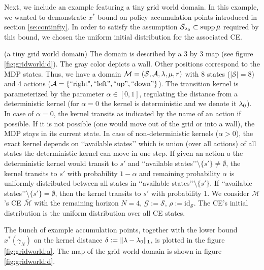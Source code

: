 Next, we include an example featuring a tiny grid world domain.
In this example, we wanted to demonstrate $x^*$ bound on \eUDRL{} policy
accumulation points introduced in section \ref{se:continfty}.
In order to satisfy the assumption $\bar{\mathcal{S}}_{\mathit{\lambda}_0} \subset \operatorname*{\mathrm{supp}} \bar{\mu}$ required by this bound, we chosen the uniform initial distribution for the associated CE.
\begin{example}\label{ex:gridworld} (a tiny grid world domain)
The domain is described by a 3 by 3 map (see figure \ref{fig:gridworld:d}).
The gray color depicts a wall. Other positions correspond to the MDP
states. Thus, we have a domain 
$\mathcal{M} = (\mathcal{S},\mathcal{A},\mathit{\lambda},\mu,r)$
with 8 states ($|\mathcal{S}| = 8$) and 4 actions 
($\mathcal{A}=\{\text{``right"},\text{\lq\lq{}left\rq\rq{}},\text{\lq\lq{}up\rq\rq{}},\text{\lq\lq{}down\rq\rq{}}\}$).
The transition kernel is parameterized by the parameter $\alpha \in [0,1]$,
regulating the distance from a deterministic kernel (for $\alpha =0$ the kernel
is deterministic and we denote it $\mathit{\lambda}_0$).
In case of $\alpha = 0$, the kernel transits as indicated by the name of an action if possible. If it is not possible (one would move out of the grid or into a wall), the MDP stays in its current state.
In case of non-deterministic kernels ($\alpha >0$), the exact kernel
depends on \lq\lq{}available states\rq\rq{} which is union (over all actions) of all states the deterministic kernel can move in one step. If given an action $a$
the deterministic kernel would transit to $s'$ and \lq\lq{}available states\rq\rq{}$\setminus \{s'\} \neq \emptyset$, the kernel transits to 
$s'$ with probability $1-\alpha$ and remaining probability $\alpha$
is uniformly distributed between all states in \lq\lq{}available states\rq\rq{}$\setminus \{s'\}$. If \lq\lq{}available states\rq\rq{}$\setminus \{s'\} = \emptyset$, then 
the kernel transits to $s'$ with probability 1.
We consider $\mathcal{M}$'s CE $\bar{\mathcal{M}}$ with the remaining horizon $N=4$,
$\mathcal{G}:=\mathcal{S}$, $\rho :=\mathrm{id}_{\mathcal{S}}$.
The CE's initial distribution is the uniform distribution over all CE states.
\end{example}
The bunch of example accumulation points, together with the lower bound $x^*(\gamma_N)$ on the kernel distance $\delta:=\|\mathit{\lambda}-\mathit{\lambda}_0\|_1$,
is plotted in the figure \ref{fig:gridworld:a}. The map
of the grid world domain is shown in figure \ref{fig:gridworld:d}.

